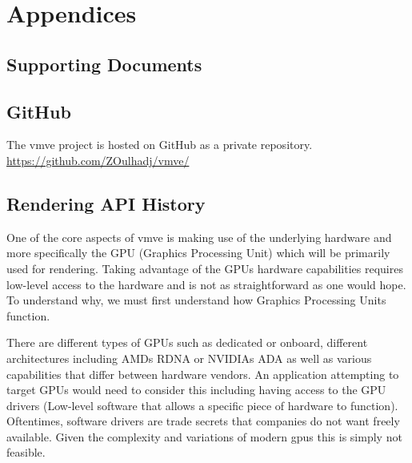 \documentclass[11pt]{article}
\begin{document}
\clearpage



\clearpage
\section{Appendices}

\subsection{Supporting Documents} \label{supporting_documents}


\subsection{GitHub} \label{github}
The \gls*{vmve} project is hosted on GitHub as a private repository.
\url{https://github.com/ZOulhadj/vmve/}

\subsection{Rendering API History} \label{rendering_api_appendix}
One of the core aspects of \gls*{vmve} is making use of the underlying hardware and
more specifically the GPU (Graphics Processing Unit) which will be primarily
used for rendering. Taking advantage of the GPUs hardware capabilities requires
low-level access to the hardware and is not as straightforward as one would
hope. To understand why, we must first understand how Graphics Processing Units
function.

There are different types of GPUs such as dedicated or onboard, different
architectures including AMDs RDNA \cite{RDNA} or NVIDIAs ADA \cite{ADA} as well
as various capabilities that differ between hardware vendors. An application
attempting to target GPUs would need to consider this including having access to
the GPU drivers (Low-level software that allows a specific piece of hardware to
function). Oftentimes, software drivers are trade secrets that companies do not
want freely available. Given the complexity and variations of modern
\glspl*{gpu} this is simply not feasible.
\end{document}
